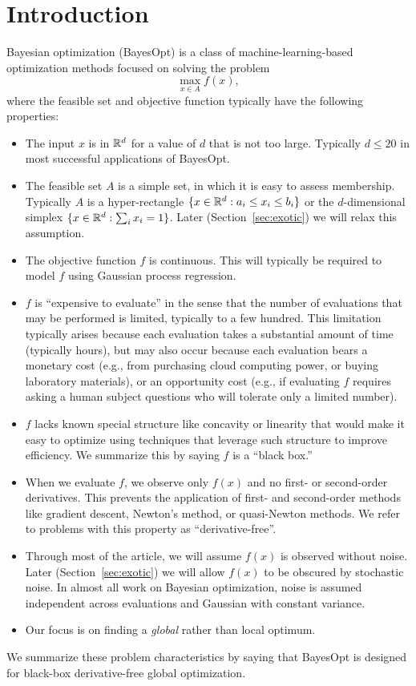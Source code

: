 \documentclass{article}
\begin{document}
\section{Introduction}
\label{sec:intro}
Bayesian optimization (BayesOpt) is a class of machine-learning-based optimization methods focused on solving the problem
\begin{equation}
\max_{x \in A} f(x), \label{eq:obj}
\end{equation}
where the feasible set and objective function typically have the following properties:
\begin{itemize}
\item The input $x$ is in $\mathbb{R}^d$ for a value of $d$ that is not too large.  Typically $d\le 20$ in most successful applications of BayesOpt.
\item The feasible set $A$ is a simple set, in which it is easy to assess membership.  Typically $A$ is a hyper-rectangle $\{ x \in \mathbb{R}^d : a_i \le x_i \le b_i \}$ or the $d$-dimensional simplex $\{ x \in \mathbb{R}^d : \sum_i x_i = 1 \}$.  Later (Section~\ref{sec:exotic}) we will relax this assumption.
\item The objective function $f$ is continuous.  This will typically be required to model $f$ using Gaussian process regression.
\item $f$ is ``expensive to evaluate'' in the sense that the number of evaluations that may be performed is limited, typically to a few hundred.  This limitation typically arises because each evaluation takes a substantial amount of time (typically hours), but may also occur because each evaluation bears a monetary cost (e.g., from purchasing cloud computing power, or buying laboratory materials), or an opportunity cost (e.g., if evaluating $f$ requires asking a human subject questions who will tolerate only a limited number). 

\item $f$ lacks known special structure like concavity or linearity that would make it easy to optimize using techniques that leverage such structure to improve efficiency.  We summarize this by saying $f$ is a ``black box.''
\item When we evaluate $f$, we observe only $f(x)$ and no first- or second-order derivatives.  This prevents the application of first- and second-order methods like gradient descent, Newton's method, or quasi-Newton methods.  We refer to problems with this property as ``derivative-free''.
\item Through most of the article, we will assume $f(x)$ is observed without noise. Later (Section~\ref{sec:exotic}) we will allow $f(x)$ to be obscured by stochastic noise.  In almost all work on Bayesian optimization, noise is assumed independent across evaluations and Gaussian with constant variance. 
\item Our focus is on finding a {\it global} rather than local optimum.
\end{itemize}
We summarize these problem characteristics by saying that BayesOpt is designed for black-box derivative-free global optimization.
\end{document}
